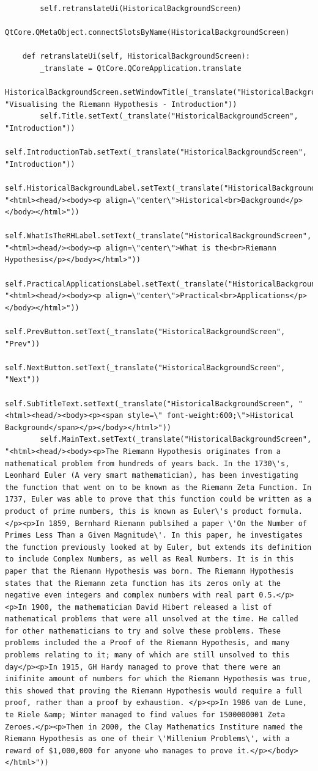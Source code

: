 \documentclass[12pt]{article}
\begin{document}
\begin{lstlisting}
        self.retranslateUi(HistoricalBackgroundScreen)
        QtCore.QMetaObject.connectSlotsByName(HistoricalBackgroundScreen)

    def retranslateUi(self, HistoricalBackgroundScreen):
        _translate = QtCore.QCoreApplication.translate
        HistoricalBackgroundScreen.setWindowTitle(_translate("HistoricalBackgroundScreen", "Visualising the Riemann Hypothesis - Introduction"))
        self.Title.setText(_translate("HistoricalBackgroundScreen", "Introduction"))
        self.IntroductionTab.setText(_translate("HistoricalBackgroundScreen", "Introduction"))
        self.HistoricalBackgroundLabel.setText(_translate("HistoricalBackgroundScreen", "<html><head/><body><p align=\"center\">Historical<br>Background</p></body></html>"))
        self.WhatIsTheRHLabel.setText(_translate("HistoricalBackgroundScreen", "<html><head/><body><p align=\"center\">What is the<br>Riemann Hypothesis</p></body></html>"))
        self.PracticalApplicationsLabel.setText(_translate("HistoricalBackgroundScreen", "<html><head/><body><p align=\"center\">Practical<br>Applications</p></body></html>"))
        self.PrevButton.setText(_translate("HistoricalBackgroundScreen", "Prev"))
        self.NextButton.setText(_translate("HistoricalBackgroundScreen", "Next"))
        self.SubTitleText.setText(_translate("HistoricalBackgroundScreen", "<html><head/><body><p><span style=\" font-weight:600;\">Historical Background</span></p></body></html>"))
        self.MainText.setText(_translate("HistoricalBackgroundScreen", "<html><head/><body><p>The Riemann Hypothesis originates from a mathematical problem from hundreds of years back. In the 1730\'s, Leonhard Euler (A very smart mathematician), has been investigating the function that went on to be known as the Riemann Zeta Function. In 1737, Euler was able to prove that this function could be written as a product of prime numbers, this is known as Euler\'s product formula.</p><p>In 1859, Bernhard Riemann publsihed a paper \'On the Number of Primes Less Than a Given Magnitude\'. In this paper, he investigates the function previously looked at by Euler, but extends its definition to include Complex Numbers, as well as Real Numbers. It is in this paper that the Riemann Hypothesis was born. The Riemann Hypothesis states that the Riemann zeta function has its zeros only at the negative even integers and complex numbers with real part 0.5.</p><p>In 1900, the mathematician David Hibert released a list of mathematical problems that were all unsolved at the time. He called for other mathematicians to try and solve these problems. These problems included the a Proof of the Riemann Hypothesis, and many problems relating to it; many of which are still unsolved to this day</p><p>In 1915, GH Hardy managed to prove that there were an inifinite amount of numbers for which the Riemann Hypothesis was true, this showed that proving the Riemann Hypothesis would require a full proof, rather than a proof by exhaustion. </p><p>In 1986 van de Lune, te Riele &amp; Winter managed to find values for 1500000001 Zeta Zeroes.</p><p>Then in 2000, the Clay Mathematics Institure named the Riemann Hypothesis as one of their \'Millenium Problems\', with a reward of $1,000,000 for anyone who manages to prove it.</p></body></html>"))

\end{lstlisting}
\end{document}
